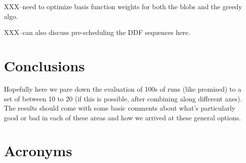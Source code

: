 XXX--need to optimize basis function weights for both the blobs and the greedy algo.

XXX--can also discuss pre-scheduling the DDF sequences here.

\section{Conclusions}
Hopefully here we pare down the evaluation of 100s of runs (like promised) to a set of between 10 to 20 (if this is possible, after combining along different axes). 
The results should come with some basic comments about what's particularly good or bad in each of these areas and how we arrived at these general options. 




\section{Acronyms} \label{sec:acronyms}


